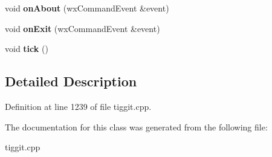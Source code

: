 \begin{DoxyCompactItemize}
\item 
\hypertarget{class_my_frame_a541ab015e0d63755625d7b2a9173b305}{void {\bfseries on\-About} (wx\-Command\-Event \&event)}\label{class_my_frame_a541ab015e0d63755625d7b2a9173b305}

\item 
\hypertarget{class_my_frame_acd6b9b007ba77be5ff19bd494d5811a7}{void {\bfseries on\-Exit} (wx\-Command\-Event \&event)}\label{class_my_frame_acd6b9b007ba77be5ff19bd494d5811a7}

\item 
\hypertarget{class_my_frame_ab7b0fe33a09b9a71c92dcdc968c44e13}{void {\bfseries tick} ()}\label{class_my_frame_ab7b0fe33a09b9a71c92dcdc968c44e13}

\end{DoxyCompactItemize}


\subsection{Detailed Description}


Definition at line 1239 of file tiggit.\-cpp.



The documentation for this class was generated from the following file\-:\begin{DoxyCompactItemize}
\item 
tiggit.\-cpp\end{DoxyCompactItemize}
